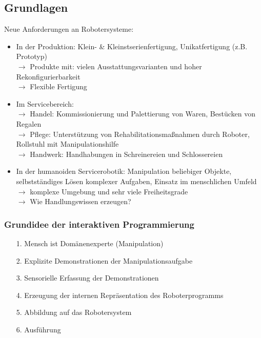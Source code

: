 \subsection{Grundlagen}
Neue Anforderungen an Robotersysteme:
\begin{itemize}
\item In der Produktion: Klein- \& Kleinstserienfertigung, Unikatfertigung (z.B. Prototyp)\\
$\rightarrow$ Produkte mit: vielen Ausstattungsvarianten und hoher Rekonfigurierbarkeit\\
$\rightarrow$ Flexible Fertigung
\item Im Servicebereich: \\
$\rightarrow$ Handel:  Kommissionierung und Palettierung von Waren, Bestücken von Regalen\\
$\rightarrow$ Pflege: Unterstützung von Rehabilitationsmaßnahmen durch Roboter, Rollstuhl mit Manipulationshilfe\\
$\rightarrow$ Handwerk: Handhabungen in Schreinereien und Schlossereien
\item In der humanoiden Servicerobotik: Manipulation beliebiger Objekte, selbstständiges Lösen komplexer Aufgaben, Einsatz im menschlichen Umfeld\\
$\rightarrow$ komplexe Umgebung und sehr viele Freiheitsgrade\\
$\rightarrow$ Wie Handlungswissen erzeugen?
\end{itemize}

\subsubsection*{Grundidee der interaktiven Programmierung} %
\begin{itemize}
\item[1.]Mensch ist Domänenexperte (Manipulation)
\item[2.]Explizite Demonstrationen der Manipulationsaufgabe
\item[3.]Sensorielle Erfassung der Demonstrationen
\item[4.]Erzeugung der internen Repräsentation des Roboterprogramms
\item[5.]Abbildung auf das Robotersystem
\item[6.]Ausführung
\end{itemize}


